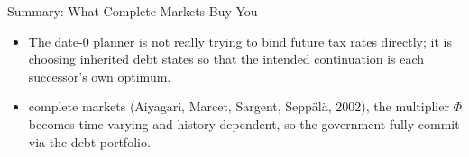 \documentclass[11pt,xcolor={dvipsnames},aspectratio=159,hyperref={pdftex,pdfpagemode=UseNone,hidelinks,pdfdisplaydoctitle=true},usepdftitle=false]{beamer}
\begin{document}
	            \begin{frame}{Summary: What Complete Markets Buy You}
	                \begin{itemize}
	                \item The date-0 planner is not really trying to bind future tax rates directly; it is choosing inherited debt states so that the intended continuation is each successor's own optimum.
	                \item {} complete markets (Aiyagari, Marcet, Sargent, Sepp\"al\"a, 2002), the multiplier $\Phi$ becomes time-varying and history-dependent, so the government  fully commit via the debt portfolio.
	                \end{itemize}
	            \end{frame}
\end{document}
